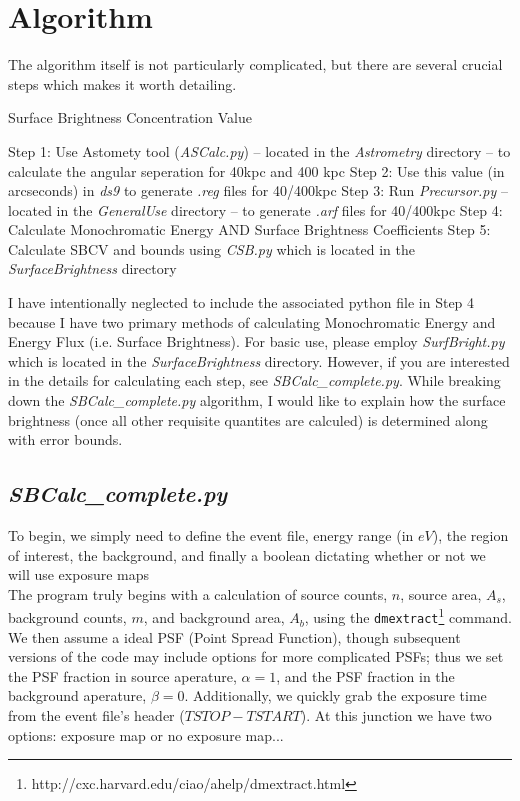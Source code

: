 \documentclass[11pt,letterpaper]{article}
\begin{document}
\section{Algorithm}
The algorithm itself is not particularly complicated, but there are several crucial steps which makes it worth detailing.

\begin{algorithm}[H]\label{algo:BA}
	\caption{Surface Brightness Concentration Value}
	Step 1: Use Astomety tool (\textit{ASCalc.py}) -- located in the \textit{Astrometry} directory -- to calculate the angular seperation for 40kpc and 400 kpc\;
	Step 2: Use this value (in arcseconds) in \textit{ds9} to generate \textit{.reg} files for 40/400kpc\;
	Step 3: Run \textit{Precursor.py} -- located in the \textit{GeneralUse} directory -- to generate \textit{.arf} files for 40/400kpc\;
	Step 4: Calculate Monochromatic Energy AND Surface Brightness Coefficients\;
	Step 5: Calculate SBCV and bounds using \textit{CSB.py} which is located in the \textit{SurfaceBrightness} directory\;
\end{algorithm}

I have intentionally neglected to include the associated python file in Step 4 because I have two primary methods of calculating Monochromatic Energy and Energy Flux (i.e. Surface Brightness). For basic use, please employ  \textit{SurfBright.py} which is located in the \textit{SurfaceBrightness} directory. However, if you are interested in the details for calculating each step, see \textit{SBCalc\_complete.py}. While breaking down the \textit{SBCalc\_complete.py} algorithm, I would like to explain how the surface brightness (once all other requisite quantites are calculed) is determined along with error bounds.


\subsection{\textit{SBCalc\_complete.py}}
To begin, we simply need to define the event file, energy range (in $eV$), the region of interest, the background, and finally a boolean dictating whether or not we will use exposure maps\\
The program truly begins with a calculation of source counts, $n$, source area, $A_s$, background counts, $m$, and background area, $A_b$, using the \texttt{dmextract}\footnote{http://cxc.harvard.edu/ciao/ahelp/dmextract.html} command. We then assume a ideal PSF (Point Spread Function), though subsequent versions of the code may include options for more complicated PSFs; thus we set the PSF fraction in source aperature, $\alpha = 1$, and the PSF fraction in the  background aperature, $\beta = 0$. Additionally, we quickly grab the exposure time from the event file's header ($TSTOP-TSTART$). At this junction we have two options: exposure map or no exposure map...\\
\end{document}
